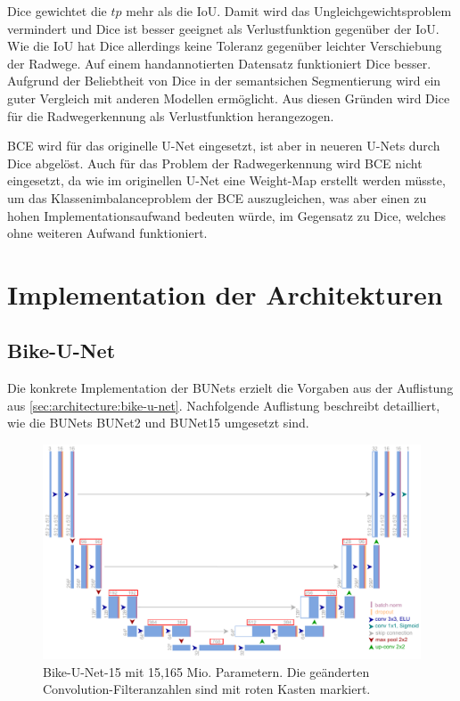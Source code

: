 Dice gewichtet die $tp$ mehr als die \ac{IoU}. Damit wird das Ungleichgewichtsproblem vermindert und Dice ist 
besser geeignet als Verlustfunktion gegenüber der \ac{IoU}. Wie die \ac{IoU} hat Dice allerdings keine Toleranz 
gegenüber leichter Verschiebung der Radwege. Auf einem handannotierten Datensatz funktioniert Dice besser. 
Aufgrund der Beliebtheit von Dice in der semantsichen Segmentierung 
wird ein guter Vergleich mit anderen Modellen ermöglicht. 
Aus diesen Gründen wird Dice für die Radwegerkennung als Verlustfunktion herangezogen.

\acf{BCE} wird für das originelle U-Net eingesetzt, ist aber in neueren U-Nets durch Dice abgelöst. 
Auch für das Problem der Radwegerkennung wird BCE nicht eingesetzt, da wie im originellen U-Net eine Weight-Map erstellt werden müsste, 
um das Klassenimbalanceproblem der BCE auszugleichen, was aber einen zu hohen Implementationsaufwand bedeuten würde, im Gegensatz zu 
Dice, welches ohne weiteren Aufwand funktioniert. 

\section{Implementation der Architekturen} \label{sec:arch-impl}

\subsection{Bike-U-Net} \label{sec:arch-impl:bunet}

Die konkrete Implementation der \acp{BUNet} erzielt die Vorgaben aus der Auflistung aus \autoref{sec:architecture:bike-u-net}. 
Nachfolgende Auflistung beschreibt detailliert, wie die \acp{BUNet} \ac{BUNet2} und \ac{BUNet15} umgesetzt sind.  

\begin{figure}
	\centering
	\includegraphics[width=1.\textwidth]{Bilder/own-unet-15mil-marked.pdf} 
	\caption{Bike-U-Net-15 mit 15,165 Mio. Parametern. Die geänderten Convolution-Filteranzahlen sind mit roten Kasten markiert.}
	\label{fig:bike-unet-15}
\end{figure} 

